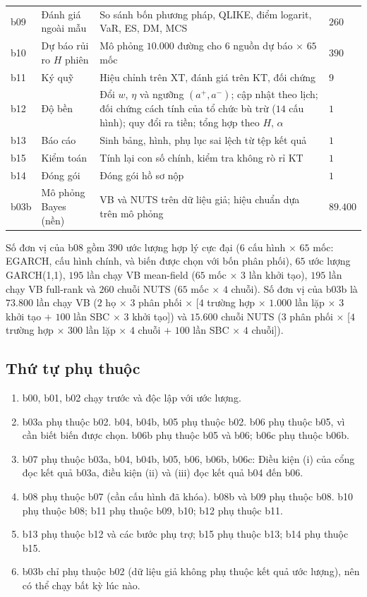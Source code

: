 \documentclass[12pt,a4paper]{article}
\theoremstyle{remark}
\newcommand{\XT}{\mathrm{XT}}
\newcommand{\KT}{\mathrm{KT}}
\begin{document}
\begin{longtable}{@{}p{1.2cm}p{4.1cm}p{5.6cm}p{3.2cm}@{}}
b09 & Đánh giá ngoài mẫu & So sánh bốn phương pháp, QLIKE, điểm logarit, VaR, ES, DM, MCS & $260$ \\
b10 & Dự báo rủi ro $H$ phiên & Mô phỏng $10.000$ đường cho $6$ nguồn dự báo $\times$ $65$ mốc & $390$ \\
b11 & Ký quỹ & Hiệu chỉnh trên $\XT$, đánh giá trên $\KT$, đối chứng & $9$ \\
b12 & Độ bền & Đổi $w$, $\eta$ và ngưỡng $(a^{+},a^{-})$; cập nhật theo lịch; đối chứng cách tính của tổ chức bù trừ ($14$ cấu hình); quy đổi ra tiền; tổng hợp theo $H$, $\alpha$ & $1$ \\
b13 & Báo cáo & Sinh bảng, hình, phụ lục sai lệch từ tệp kết quả & $1$ \\
b15 & Kiểm toán & Tính lại con số chính, kiểm tra không rò rỉ $\KT$ & $1$ \\
b14 & Đóng gói & Đóng gói hồ sơ nộp & $1$ \\
b03b & Mô phỏng Bayes (nền) & VB và NUTS trên dữ liệu giả; hiệu chuẩn dựa trên mô phỏng & $89.400$ \\
\end{longtable}

Số đơn vị của b08 gồm $390$ ước lượng hợp lý cực đại ($6$ cấu hình $\times$ $65$ mốc: EGARCH, cấu hình chính, và biến được chọn với bốn phân phối), $65$ ước lượng GARCH(1,1), $195$ lần chạy VB mean-field ($65$ mốc $\times$ $3$ lần khởi tạo), $195$ lần chạy VB full-rank và $260$ chuỗi NUTS ($65$ mốc $\times$ $4$ chuỗi). Số đơn vị của b03b là $73.800$ lần chạy VB ($2$ họ $\times$ $3$ phân phối $\times$ [$4$ trường hợp $\times$ $1.000$ lần lặp $\times$ $3$ khởi tạo $+$ $100$ lần SBC $\times$ $3$ khởi tạo]) và $15.600$ chuỗi NUTS ($3$ phân phối $\times$ [$4$ trường hợp $\times$ $300$ lần lặp $\times$ $4$ chuỗi $+$ $100$ lần SBC $\times$ $4$ chuỗi]).

\subsection{Thứ tự phụ thuộc}

\begin{enumerate}
\item b00, b01, b02 chạy trước và độc lập với ước lượng.
\item b03a phụ thuộc b02. b04, b04b, b05 phụ thuộc b02. b06 phụ thuộc b05, vì cần biết biến được chọn. b06b phụ thuộc b05 và b06; b06c phụ thuộc b06b.
\item b07 phụ thuộc b03a, b04, b04b, b05, b06, b06b, b06c: Điều kiện (i) của cổng đọc kết quả b03a, điều kiện (ii) và (iii) đọc kết quả b04 đến b06.
\item b08 phụ thuộc b07 (cần cấu hình đã khóa). b08b và b09 phụ thuộc b08. b10 phụ thuộc b08; b11 phụ thuộc b09, b10; b12 phụ thuộc b11.
\item b13 phụ thuộc b12 và các bước phụ trợ; b15 phụ thuộc b13; b14 phụ thuộc b15.
\item b03b chỉ phụ thuộc b02 (dữ liệu giả không phụ thuộc kết quả ước lượng), nên có thể chạy bất kỳ lúc nào.
\end{enumerate}
\end{document}
